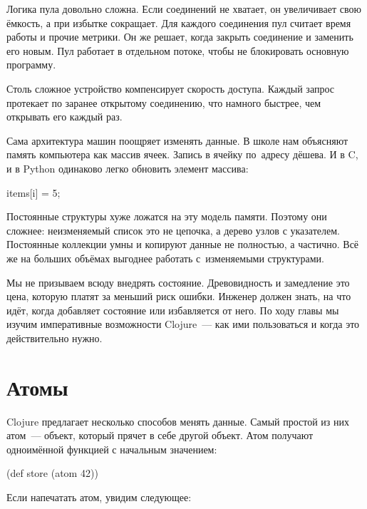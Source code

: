 Логика пула довольно сложна. Если соединений не хватает, он увеличивает свою
ёмкость, а при избытке сокращает. Для каждого соединения пул считает время
работы и прочие метрики. Он же решает, когда закрыть соединение и заменить его
новым. Пул работает в отдельном потоке, чтобы не блокировать основную программу.

Столь сложное устройство компенсирует скорость доступа. Каждый запрос протекает
по заранее открытому соединению, что намного быстрее, чем открывать его каждый
раз.

Сама архитектура машин поощряет изменять данные. В школе нам объясняют память
компьютера как массив ячеек. Запись в ячейку по~адресу дёшева. И в C\Plus\Plus,
и в Python одинаково легко обновить элемент массива:

\begin{english}
  \begin{python}
items[i] = 5;
  \end{python}
\end{english}

Постоянные структуры хуже ложатся на эту модель памяти. Поэтому они сложнее:
неизменяемый список это не цепочка, а дерево узлов с указателем. Постоянные
коллекции умны и копируют данные не полностью, а частично. Всё же на больших
объёмах выгоднее работать с~изменяемыми структурами.

Мы не призываем всюду внедрять состояние. Древовидность и замедление это цена,
которую платят за меньший риск ошибки. Инженер должен знать, на что идёт,
когда добавляет состояние или избавляется от него. По ходу главы мы изучим
императивные возможности Clojure~--- как ими пользоваться и когда это
действительно нужно.

\section{Атомы}


Clojure предлагает несколько способов менять данные. Самый простой из них
атом~--- объект, который прячет в себе другой объект. Атом получают
одноимённой функцией с начальным значением:

\begin{english}
  \begin{clojure}
(def store (atom 42))
  \end{clojure}
\end{english}

\noindent
Если напечатать атом, увидим следующее:

